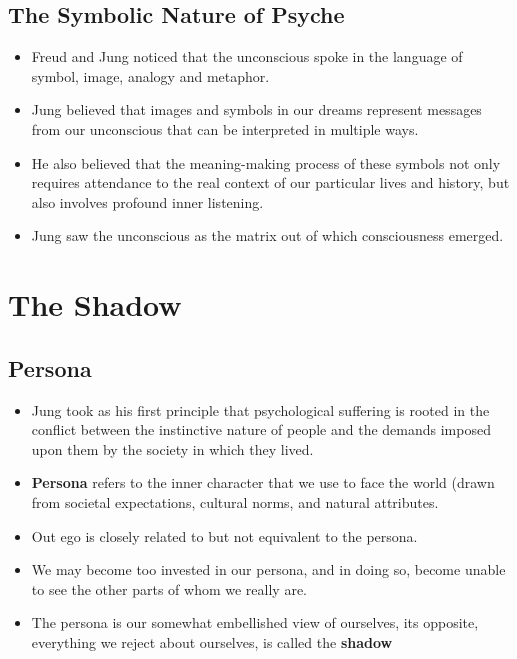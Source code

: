 \documentclass[twocolumn]{article}
\theoremstyle{plain}
\begin{document}
\subsection{The Symbolic Nature of Psyche}

\begin{itemize}
    \item Freud and Jung noticed that the unconscious spoke in the language of symbol, image, analogy and metaphor.
    \item Jung believed that images and symbols in our dreams represent messages from our unconscious that can be interpreted in multiple ways.
    \item He also believed that the meaning-making process of these symbols not only requires attendance to the real context of our particular lives and history, but also involves profound inner listening.
    \item Jung saw the unconscious as the matrix out of which consciousness emerged.
\end{itemize}

\section{The Shadow}

\subsection{Persona}

\begin{itemize}
    \item Jung took as his first principle that psychological suffering is rooted in the conflict between the instinctive nature of people and the demands imposed upon them by the society in which they lived.
    \item \textbf{Persona} refers to the inner character that we use to face the world (drawn from societal expectations, cultural norms, and natural attributes.
    \item Out ego is closely related to but not equivalent to the persona.
    \item We may become too invested in our persona, and in doing so, become unable to see the other parts of whom we really are.
    \item The persona is our somewhat embellished view of ourselves, its opposite, everything we reject about ourselves, is called the \textbf{shadow}
\end{itemize}
\end{document}
